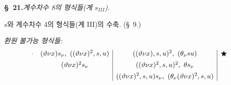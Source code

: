 
\begin{center}
\textbf{\S\ 21.}\quad\emph{계수차수 8의 형식들(계 $s_{III}$).}
\end{center}

$s$와 계수차수 4의 형식들(계 III)의 수축. (\S\ 9.)

\noindent\emph{환원 불가능 형식들:}
\[
\begin{array}{c@{\quad}c|c|c}
\cdot
& (\vartheta \nu x)s_\nu,\ ((\vartheta \nu x)^2,s,u)
& ((\vartheta \nu x),s,u)^2,\ (\theta_\nu su)
& \bigstar\\[0.45em]
& (\vartheta \nu x)^2s_\nu
& ((\vartheta \nu x)^2,s,u)^2,\ \theta s_\nu
& \\[0.45em]
&& ((\vartheta \nu x)^2,s,u)s_\nu,\ (\theta_\nu(\vartheta \nu x)^2,s,u)
&
\end{array}
\]
